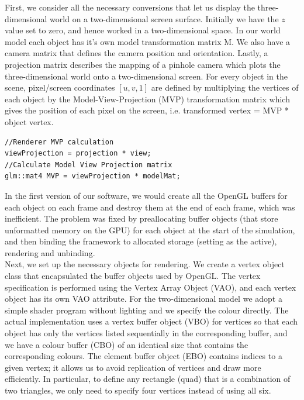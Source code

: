 \documentclass[paper=a4, fontsize=11pt]{scrartcl} %
\numberwithin{equation}{section} %
\numberwithin{figure}{section} %
\numberwithin{table}{section} %
\begin{document}
First, we consider all the necessary conversions that let us display the three-dimensional world on a two-dimensional screen surface. Initially we have the \(z\) value set to zero, and hence worked in a two-dimensional space. In our world model each object has it's own model transformation matrix M. We also have a camera matrix that defines the camera position and orientation. Lastly, a projection matrix describes the mapping of a pinhole camera which plots the three-dimensional world onto a two-dimensional screen. For every object in the scene, pixel/screen coordinates \([u, v, 1]\) are defined by multiplying the vertices of each object by the Model-View-Projection (MVP) transformation matrix which gives the position of each pixel on the screen, i.e. transformed vertex = MVP *  object vertex. \\

\begin{mdframed}
\begin{scriptsize}
\begin{lstlisting}
//Renderer MVP calculation
viewProjection = projection * view;
//Calculate Model View Projection matrix
glm::mat4 MVP = viewProjection * modelMat;
\end{lstlisting}
\end{scriptsize}
\end{mdframed}

In the first version of our software, we would create all the OpenGL buffers for each object on each frame and destroy them at the end of each frame, which was inefficient. The problem was fixed by preallocating buffer objects (that store unformatted memory on the GPU) for each object at the start of the simulation, and then binding the framework to allocated storage (setting as the active), rendering and unbinding. \\

Next, we set up the necessary objects for rendering. We create a vertex object class that encapsulated the buffer objects used by OpenGL. The vertex specification is performed using the Vertex Array Object (VAO), and each vertex object has its own VAO attribute. For the two-dimensional model we adopt a simple shader program without lighting and we specify the colour directly. The actual implementation uses a vertex buffer object (VBO) for vertices so that each object has only the vertices listed sequentially in the corresponding buffer, and we have a colour buffer (CBO) of an identical size that contains the corresponding colours. The element buffer object (EBO) contains indices to a given vertex; it allows us to avoid replication of vertices and draw more efficiently. In particular, to define any rectangle (quad) that is a combination of two triangles, we only need to specify four vertices instead of using all six. \\
\end{document}
